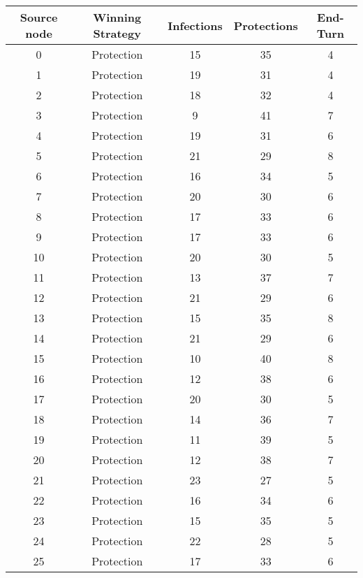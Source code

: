 \documentclass[results.tex]{subfiles}
\begin{document}
\begin{center}
  \begin{tabular}{| c || c | c | c | c |}
    \hline
    {\bfseries Source node} & {\bfseries Winning Strategy} & {\bfseries Infections} & {\bfseries Protections} & {\bfseries End-Turn} \\  %
    \hline\hline
    0 & Protection & 15 & 35 & 4 \\ 
    \hline
    1 & Protection & 19 & 31 & 4 \\ 
    \hline
    2 & Protection & 18 & 32 & 4 \\ 
    \hline
    3 & Protection & 9 & 41 & 7 \\ 
    \hline
    4 & Protection & 19 & 31 & 6 \\ 
    \hline
    5 & Protection & 21 & 29 & 8 \\ 
    \hline
    6 & Protection & 16 & 34 & 5 \\ 
    \hline
    7 & Protection & 20 & 30 & 6 \\ 
    \hline
    8 & Protection & 17 & 33 & 6 \\ 
    \hline
    9 & Protection & 17 & 33 & 6 \\ 
    \hline
    10 & Protection & 20 & 30 & 5 \\ 
    \hline
    11 & Protection & 13 & 37 & 7 \\ 
    \hline
    12 & Protection & 21 & 29 & 6 \\ 
    \hline
    13 & Protection & 15 & 35 & 8 \\ 
    \hline
    14 & Protection & 21 & 29 & 6 \\ 
    \hline
    15 & Protection & 10 & 40 & 8 \\ 
    \hline
    16 & Protection & 12 & 38 & 6 \\ 
    \hline
    17 & Protection & 20 & 30 & 5 \\ 
    \hline
    18 & Protection & 14 & 36 & 7 \\ 
    \hline
    19 & Protection & 11 & 39 & 5 \\ 
    \hline
    20 & Protection & 12 & 38 & 7 \\ 
    \hline
    21 & Protection & 23 & 27 & 5 \\ 
    \hline
    22 & Protection & 16 & 34 & 6 \\ 
    \hline
    23 & Protection & 15 & 35 & 5 \\ 
    \hline
    24 & Protection & 22 & 28 & 5 \\ 
    \hline
    25 & Protection & 17 & 33 & 6 \\ 

\end{tabular}
\end{center}
\end{document}
